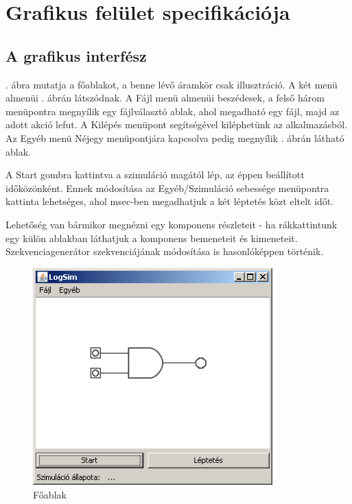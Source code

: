 %
\chapter{Grafikus felület specifikációja}

\thispagestyle{fancy}

\section{A grafikus interfész}

. ábra mutatja a főablakot, a benne lévő áramkör csak illusztráció. A két menü almenüi . ábrán látszódnak. A Fájl menü almenüi beszédesek, a felső három menüpontra megnyílik egy fájlválasztó ablak, ahol megadható egy fájl, majd az adott akció lefut. A Kilépés menüpont segítségével kiléphetünk az alkalmazásból. Az Egyéb menü Néjegy menüpontjára kapcsolva pedig megnyílik . ábrán látható ablak.

A Start gombra kattintva a szimuláció magától lép, az éppen beállított időközönként. Ennek módosítása az Egyéb/Szimuláció sebessége menüpontra kattinta lehetséges, ahol msec-ben megadhatjuk a két léptetés közt eltelt időt.

Lehetőség van bármikor megnézni egy komponens részleteit - ha rákkattintunk egy külön ablakban láthatjuk a komponens bemeneteit és kimeneteit. Szekvenciagenerátor szekvenciájának módosítása is hasonlóképpen történik.

\begin{figure}[H]
\begin{center}
\includegraphics[width=3.64in]{chapters/chapter11/screenshots/felulet.png}
\caption{Főablak}
\label{fig:main}
\end{center}
\end{figure}

